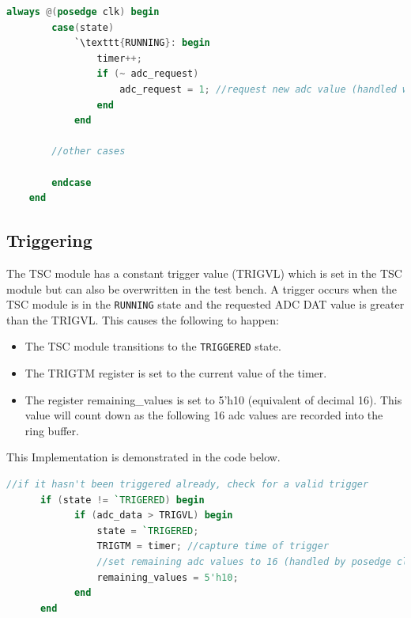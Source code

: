 \begin{lstlisting}[language=Verilog, caption={Verilog code for requesting data from the ADC on the posedge of the clock while in \texttt{RUNNING} state}, label={lst:clockrunning}]
    always @(posedge clk) begin
        case(state)
            `\texttt{RUNNING}: begin
                timer++;
                if (~ adc_request)
                    adc_request = 1; //request new adc value (handled with posedge adc_ready)
                end
            end

        //other cases

        endcase
    end
\end{lstlisting}

\subsection{Triggering}

The TSC module has a constant trigger value (TRIGVL) which is set in the TSC module but can also be overwritten in the test bench.
A trigger occurs when the TSC module is in the \texttt{RUNNING} state and the requested ADC DAT value is greater than the TRIGVL\@.
This causes the following to happen:

\begin{itemize}
      \item The TSC module transitions to the \texttt{TRIGGERED} state.
      \item The TRIGTM register is set to the current value of the timer.
      \item The register remaining\_values is set to 5'h10 (equivalent of decimal 16).
            This value will count down as the following 16 adc values are recorded into the ring buffer.
\end{itemize}

This Implementation is demonstrated in the code below.

\begin{lstlisting}[language=Verilog, caption={Code for triggering event in the TSC module}, label={lst:triggering}]
      //if it hasn't been triggered already, check for a valid trigger
      if (state != `TRIGERED) begin
            if (adc_data > TRIGVL) begin
                state = `TRIGERED;
                TRIGTM = timer; //capture time of trigger
                //set remaining adc values to 16 (handled by posedge clk)
                remaining_values = 5'h10;
            end
      end
\end{lstlisting}

